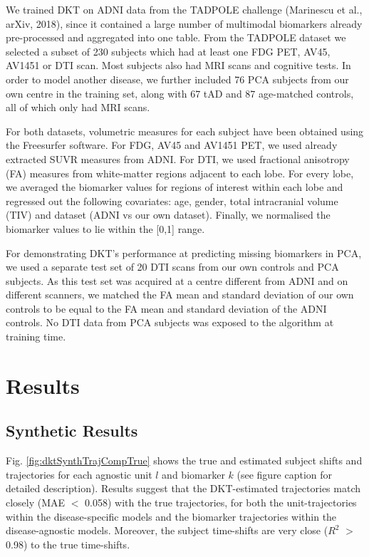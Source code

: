 \documentclass{llncs}
\begin{document}
We trained DKT on ADNI data from the TADPOLE challenge (Marinescu et al., arXiv, 2018), since it contained a large number of multimodal biomarkers already pre-processed and aggregated into one table. From the TADPOLE dataset we selected a subset of 230 subjects which had at least one FDG PET, AV45, AV1451 or DTI scan. Most subjects also had MRI scans and cognitive tests. In order to model another disease, we further included 76 PCA subjects from our own centre in the training set, along with 67 tAD and 87 age-matched controls, all of which only had MRI scans.
 
For both datasets, volumetric measures for each subject have been obtained using the Freesurfer software. For FDG, AV45 and AV1451 PET, we used already extracted SUVR measures from ADNI. For DTI, we used fractional anisotropy (FA) measures from white-matter regions adjacent to each lobe. For every lobe, we averaged the biomarker values for regions of interest within each lobe and regressed out the following covariates: age, gender, total intracranial volume (TIV) and dataset (ADNI vs our own dataset). Finally, we normalised the biomarker values to lie within the [0,1] range. 

For demonstrating DKT's performance at predicting missing biomarkers in PCA, we used a separate test set of 20 DTI scans from our own controls and PCA subjects. As this test set was acquired at a centre different from ADNI and on different scanners, we matched the FA mean and standard deviation of our own controls to be equal to the FA mean and standard deviation of the ADNI controls. No DTI data from PCA subjects was exposed to the algorithm at training time.

\section{Results}
\label{sec:dktRes}

\subsection{Synthetic Results}
\label{sec:dktResSyn}

Fig. \ref{fig:dktSynthTrajCompTrue} shows the true and estimated subject shifts and trajectories for each agnostic unit $l$ and biomarker $k$ (see figure caption for detailed description). Results suggest that the DKT-estimated trajectories match closely (MAE $<$ 0.058) with the true trajectories, for both the unit-trajectories within the disease-specific models and the biomarker trajectories within the disease-agnostic models. Moreover, the subject time-shifts are very close ($R^2$ $>$ 0.98) to the true time-shifts. 
\end{document}
